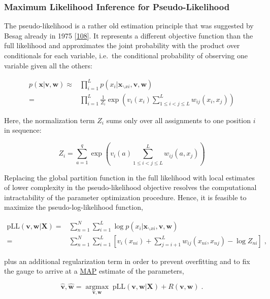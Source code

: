 \documentclass[11pt,a4paper,twoside]{book}
\newcommand{\seq}{\mathbf{x}}
\renewcommand{\v}{\mathbf{v}}
\newcommand{\w}{\mathbf{w}}
\theoremstyle{definition}
\theoremstyle{definition}
\theoremstyle{remark}
\begin{document}
\subsubsection{Maximum Likelihood Inference for
Pseudo-Likelihood}\label{pseudo-likelihood}

The pseudo-likelihood is a rather old estimation principle that was
suggested by Besag already in 1975
{[}\protect\hyperlink{ref-Besag1975}{108}{]}. It represents a different
objective function than the full likelihood and approximates the joint
probability with the product over conditionals for each variable,
i.e.~the conditional probability of observing one variable given all the
others:

\begin{align}
  p(\seq | \v,\w) \approx&   \prod_{i=1}^L p(x_i | \seq_{\backslash xi}, \v,\w) \nonumber \\
                        =&  \prod_{i=1}^L \frac{1}{Z_i} \exp \left(  v_i(x_i) \sum_{1 \leq i < j \leq L}^L w_{ij}(x_i, x_j) \right)
\end{align}

Here, the normalization term \(Z_i\) sums only over all assignments to
one position \(i\) in sequence:

\begin{equation}
  Z_i = \sum_{a=1}^{q} \exp \left( v_i(a) \sum_{1 \leq i < j \leq L}^L w_{ij}(a, x_j) \right)
\label{eq:partition-fct-pll}
\end{equation}

Replacing the global partition function in the full likelihood with
local estimates of lower complexity in the pseudo-likelihood objective
resolves the computational intractability of the parameter optimization
procedure. Hence, it is feasible to maximize the pseudo-log-likelihood
function,

\begin{align}
    \text{pLL}(\v, \w | \mathbf{X}) =& \sum_{n=1}^N \sum_{i=1}^L \log p(x_i | \seq_{\backslash xi}, \v,\w) \nonumber \\
    =& \sum_{n=1}^N \sum_{i=1}^L  \left[ v_i(x_{ni}) + \sum_{j=i+1}^L  w_{ij}(x_{ni}, x_{nj}) - \log Z_{ni} \right] \;,
\end{align}

plus an additional regularization term in order to prevent overfitting
and to fix the gauge to arrive at a \protect\hyperlink{abbrev}{MAP}
estimate of the parameters,

\begin{equation}
    \hat{\v}, \hat{\w} = \underset{\v, \w}{\operatorname{argmax}} \; \text{pLL}(\v, \w | \mathbf{X}) + R(\v, \w) \; .
\end{equation}
\end{document}
